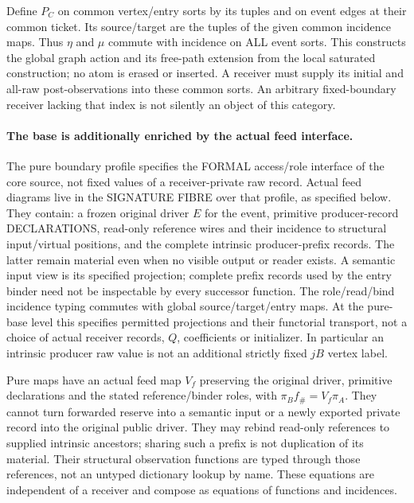 \documentclass[11pt]{article}
\begin{document}
Define $P_C$ on common vertex/entry sorts by its tuples and on event edges at their common ticket. Its source/target are the tuples of the given common incidence maps. Thus $\eta$ and $\mu$ commute with incidence on ALL event sorts. This constructs the global graph action and its free-path extension from the local saturated construction; no atom is erased or inserted. A receiver must supply its initial and all-raw post-observations into these common sorts. An arbitrary fixed-boundary receiver lacking that index is not silently an object of this category.

\paragraph{The base is additionally enriched by the actual feed interface.}
The pure boundary profile specifies the FORMAL access/role interface of the core source, not fixed values of a receiver-private raw record. Actual feed diagrams live in the SIGNATURE FIBRE over that profile, as specified below. They contain: a frozen original driver $E$ for the event, primitive producer-record DECLARATIONS, read-only reference wires and their incidence to structural input/virtual positions, and the complete intrinsic producer-prefix records. The latter remain material even when no visible output or reader exists. A semantic input view is its specified projection; complete prefix records used by the entry binder need not be inspectable by every successor function. The role/read/bind incidence typing commutes with global source/target/entry maps. At the pure-base level this specifies permitted projections and their functorial transport, not a choice of actual receiver records, $Q$, coefficients or initializer. In particular an intrinsic producer raw value is not an additional strictly fixed $jB$ vertex label.

Pure maps have an actual feed map $V_f$ preserving the original driver, primitive declarations and the stated reference/binder roles, with $\pi_B f_\#=V_f\pi_A$. They cannot turn forwarded reserve into a semantic input or a newly exported private record into the original public driver. They may rebind read-only references to supplied intrinsic ancestors; sharing such a prefix is not duplication of its material. Their structural observation functions are typed through those references, not an untyped dictionary lookup by name. These equations are independent of a receiver and compose as equations of functions and incidences.
\end{document}
